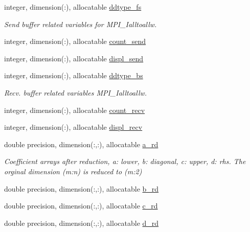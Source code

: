 \begin{DoxyCompactItemize}
\item 
integer, dimension(\+:), allocatable \hyperlink{structpascal__tdma_1_1ptdma__plan__many_ad95f6ed58387dd66baecf53ed5fab7e8}{ddtype\+\_\+fs}
\begin{DoxyCompactList}\small\item\em Send buffer related variables for M\+P\+I\+\_\+\+Ialltoallw. \end{DoxyCompactList}\item 
integer, dimension(\+:), allocatable \hyperlink{structpascal__tdma_1_1ptdma__plan__many_ab7a5a4be85650cfe4dfc30fd83b132d7}{count\+\_\+send}
\item 
integer, dimension(\+:), allocatable \hyperlink{structpascal__tdma_1_1ptdma__plan__many_a1c7544758e7ccfcd3b07e91caf0d8f3d}{displ\+\_\+send}
\end{DoxyCompactItemize}

\textbf{ }\par
\begin{DoxyCompactItemize}
\item 
integer, dimension(\+:), allocatable \hyperlink{structpascal__tdma_1_1ptdma__plan__many_a54ddb10078b443daf47204cdcd8e7f8f}{ddtype\+\_\+bs}
\begin{DoxyCompactList}\small\item\em Recv. buffer related variables M\+P\+I\+\_\+\+Ialltoallw. \end{DoxyCompactList}\item 
integer, dimension(\+:), allocatable \hyperlink{structpascal__tdma_1_1ptdma__plan__many_a30cebfb14bfcc955d3e98d9b1ea5fad7}{count\+\_\+recv}
\item 
integer, dimension(\+:), allocatable \hyperlink{structpascal__tdma_1_1ptdma__plan__many_a1801ea6bbff319dd594a5e993bc5d542}{displ\+\_\+recv}
\end{DoxyCompactItemize}

\textbf{ }\par
\begin{DoxyCompactItemize}
\item 
double precision, dimension(\+:,\+:), allocatable \hyperlink{structpascal__tdma_1_1ptdma__plan__many_a6d9101716eca623dc8c45075788f06bd}{a\+\_\+rd}
\begin{DoxyCompactList}\small\item\em Coefficient arrays after reduction, a\+: lower, b\+: diagonal, c\+: upper, d\+: rhs. The orginal dimension (m\+:n) is reduced to (m\+:2) \end{DoxyCompactList}\item 
double precision, dimension(\+:,\+:), allocatable \hyperlink{structpascal__tdma_1_1ptdma__plan__many_a81ed1b6910c30334e93598f7d18254a3}{b\+\_\+rd}
\item 
double precision, dimension(\+:,\+:), allocatable \hyperlink{structpascal__tdma_1_1ptdma__plan__many_a56b15fe2b742c06106a46da7a720d9fd}{c\+\_\+rd}
\item 
double precision, dimension(\+:,\+:), allocatable \hyperlink{structpascal__tdma_1_1ptdma__plan__many_aa1054814f874504a77ad17a838a80fd2}{d\+\_\+rd}
\end{DoxyCompactItemize}


